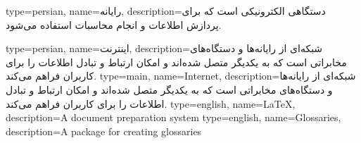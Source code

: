 \usepackage{amsthm,amssymb,amsmath}
\usepackage[top=40mm, bottom=40mm, left=25mm, right=35mm]{geometry}
\usepackage{graphicx}
\usepackage{framed} 
\usepackage{lastpage}
\usepackage[numbers,square,sort&compress]{natbib}
\usepackage[version=4]{mhchem}
\usepackage[xindy]{imakeidx}
\usepackage{pdfpages}

\usepackage[pagebackref=false]{hyperref}
\hypersetup{
  colorlinks   = true, %
  urlcolor     = black, %
  linkcolor    = black, %
  citecolor   = black %
}
\usepackage[xindy,acronym,nonumberlist=true]{glossaries}

\usepackage{fancyhdr}
\usepackage{setspace}
\usepackage{algorithm}
\usepackage{algorithmic}
\usepackage{subfigure}
\usepackage{caption}
\usepackage[subfigure]{tocloft}
\usepackage[nottoc]{tocbibind}
\usepackage{chemformula}


{}

\makeglossaries

{
    type=persian,
    name={رایانه},
    description={دستگاهی الکترونیکی است که برای پردازش اطلاعات و انجام محاسبات استفاده می‌شود.}
}

{
    type=persian,
    name={اینترنت},
    description={شبکه‌ای از رایانه‌ها و دستگاه‌های مخابراتی است که به یکدیگر متصل شده‌اند و امکان ارتباط و تبادل اطلاعات را برای کاربران فراهم می‌کند.}
}
{
    type=main,
    name={Internet},
    description={شبکه‌ای از رایانه‌ها و دستگاه‌های مخابراتی است که به یکدیگر متصل شده‌اند و امکان ارتباط و تبادل اطلاعات را برای کاربران فراهم می‌کند.}
}
{
    type=english,
    name={LaTeX},
    description={A document preparation system}
}
{
    type=english,
    name={Glossaries},
    description={A package for creating glossaries}
}


